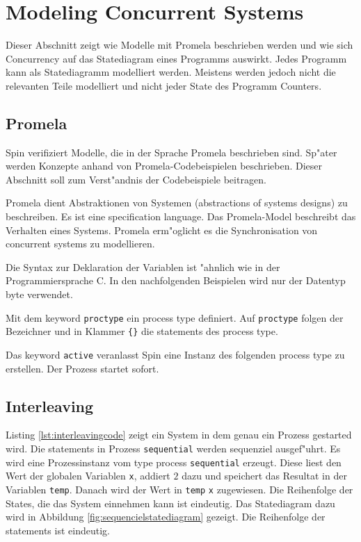 \documentclass[11pt,twoside,a4paper]{article}
\begin{document}
\section{Modeling Concurrent Systems}
\label{sec:concurrency}

Dieser Abschnitt zeigt wie Modelle mit Promela beschrieben werden und wie sich Concurrency auf das Statediagram eines Programms auswirkt. Jedes Programm kann als Statediagramm modelliert werden. Meistens werden jedoch nicht die relevanten Teile modelliert und nicht jeder State des Programm Counters.

\subsection{Promela}
\label{sec:promela}

Spin verifiziert Modelle, die in der Sprache Promela beschrieben sind. Sp"ater werden Konzepte anhand von Promela-Codebeispielen beschrieben. Dieser Abschnitt soll zum Verst"andnis der Codebeispiele beitragen.

Promela dient Abstraktionen von Systemen (abstractions of systems designs) zu beschreiben. Es ist eine specification language. Das Promela-Model beschreibt das Verhalten eines Systems. Promela erm"oglicht es die Synchronisation von concurrent systems zu modellieren.

Die Syntax zur Deklaration der Variablen ist "ahnlich wie in der Programmiersprache C. In den nachfolgenden Beispielen wird nur der Datentyp byte verwendet.

Mit dem keyword \verb|proctype| ein process type definiert. Auf \verb|proctype| folgen der Bezeichner und in Klammer \verb|{}| die statements des process type. \cite{holzmann03}

Das keyword \verb|active| veranlasst Spin eine Instanz des folgenden process type zu erstellen. Der Prozess startet sofort. 

\subsection{Interleaving}
\label{sec:interleaving}

Listing \ref{lst:interleavingcode} zeigt ein System in dem genau ein Prozess gestarted wird. Die statements in Prozess \verb|sequential| werden sequenziel ausgef"uhrt. Es wird eine Prozessinstanz vom type process \verb|sequential| erzeugt. Diese liest den Wert der globalen Variablen \verb|x|, addiert $2$ dazu und speichert das Resultat in der Variablen \verb|temp|. Danach wird der Wert in \verb|temp| \verb|x| zugewiesen. Die Reihenfolge der States, die das System einnehmen kann ist eindeutig. Das Statediagram dazu wird in Abbildung \ref{fig:sequencielstatediagram} gezeigt. Die Reihenfolge der statements ist eindeutig.
\end{document}
